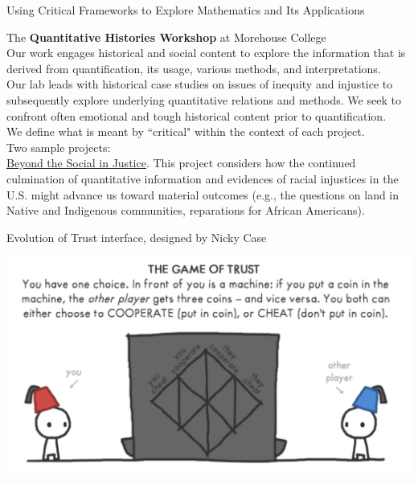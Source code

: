 \documentclass[10pt]{beamer} %
\theoremstyle{plain} %
\theoremstyle{definition} %
\begin{document}
\begin{frame}{\color{Maroon} \small Using Critical Frameworks to Explore Mathematics and Its Applications}

{\color{Maroon} The \textbf{Quantitative Histories Workshop} at Morehouse College} \\ 
\noindent \small Our work engages historical and social content to explore the information that is derived from quantification, its usage, various methods, and interpretations. \\
\vfill
Our lab leads with historical case studies on issues of inequity and injustice to subsequently explore underlying quantitative relations and methods. We seek to confront often emotional and tough historical content prior to quantification. \\
\vfill
We define what is meant by ``critical" within the context of each project. \\
\vfill
\noindent Two sample projects: \\
\vfill
\underline{Beyond the Social in Justice}. This project considers how the continued culmination of quantitative information and evidences of racial injustices in the U.S. might advance us toward material outcomes (e.g., the questions on land in Native and Indigenous communities, reparations for African Americans). 
\vfill
\noindent{}\hfill
 \vfill
\end{frame}

\begin{frame}{Evolution of Trust interface, designed by Nicky Case}

\includegraphics[width=\linewidth]{evolution.png}
\end{frame}
\end{document}
